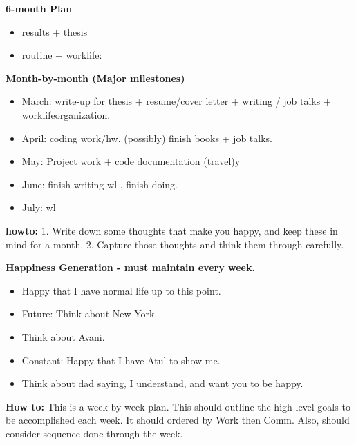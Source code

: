 \documentclass[serif, mathserif, final]{beamer}
\begin{document}
\textbf{6-month Plan} 
\begin{itemize} 
  \tiny \item \tiny results + thesis
\item \tiny routine + worklife:
\end{itemize}
\newpage
    {\small \underline{\textbf{Month-by-month (Major milestones)}}}\\
    \begin{itemize}
      \item \small March: write-up for thesis + resume/cover letter  +
         writing / job talks +    worklifeorganization. 
      \item \small April: coding work/hw. (possibly) finish books +
        job talks. 
      \item \small May: Project work + code documentation (travel)y
      \item \small June: finish writing wl , finish doing.
        \item \small July:  wl
    \end{itemize} 
\newpage 
\textbf{howto:} 1. Write down some thoughts that make you happy, and
keep these in mind for a month.  2. Capture those thoughts and think them through carefully. 

\textbf{Happiness Generation - must maintain every week.}
\begin{itemize}
  \tiny \item \tiny Happy that I have normal life up to this point.
  \item \tiny Future: Think about New York. 
  \item \tiny Think about Avani. 
  \item \tiny Constant: Happy that I have Atul to show me.
  \item \tiny Think about dad saying, I understand, and want you to be happy. 
\end{itemize} 

\newpage 
\textbf{How to:} This is a week by week plan. This should outline the
high-level goals to be accomplished each week. It should ordered by
Work then Comm. Also, should consider sequence done through the week.  \\
\end{document}
